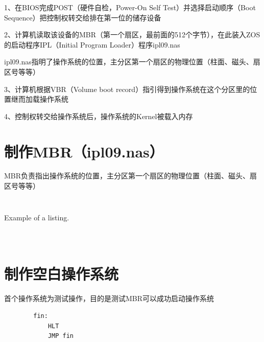 \documentclass{swfcthesis}
\begin{document}
		1、在BIOS完成POST（硬件自检，Power-On Self Test）并选择启动顺序（Boot Sequence）把控制权转交给排在第一位的储存设备
		
		2、计算机读取该设备的MBR（第一个扇区，最前面的512个字节），在此装入ZOS的启动程序IPL（Initial Program Loader）程序ipl09.nas
		
		\hspace*{1cm}ipl09.nas指明了操作系统的位置，主分区第一个扇区的物理位置（柱面、磁头、扇区号等等）

		3、计算机根据VBR（Volume boot record）指引得到操作系统在这个分区里的位置继而加载操作系统
		
		4、控制权转交给操作系统后，操作系统的Kernel被载入内存
		
	\section{制作MBR（ipl09.nas）}

		MBR负责指出操作系统的位置，主分区第一个扇区的物理位置（柱面、磁头、扇区号等等）

		\begin{listing}[H]
			
			\inputminted[tabsize=2, firstline=6, lastline=6,
			linenos=true]{nasm}{../ZOS/src/kernel/ipl09.nas}
			\inputminted[tabsize=2, firstline=12, lastline=29,
			linenos=true]{nasm}{../ZOS/src/kernel/ipl09.nas}
			\caption{Example of a listing.}
			\label{lst:example}
		\end{listing}
		
		\inputminted[tabsize=2, firstline=43, lastline=45,
		linenos=true]{nasm}{../ZOS/src/kernel/ipl09.nas}
		
		\inputminted[tabsize=2, firstline=76, lastline=88,
		linenos=true]{nasm}{../ZOS/src/kernel/ipl09.nas}
	
	\begin{listing}[H]
		\inputminted[tabsize=2, firstline=125, lastline=147,
		linenos=true]{nasm}{../ZOS/src/kernel/ipl09.nas}
	\end{listing}

	\section{制作空白操作系统}

	首个操作系统为测试操作，目的是测试MBR可以成功启动操作系统

	\begin{verbatim}
		fin:
		    HLT
		    JMP fin
	\end{verbatim}
	
\end{document}
